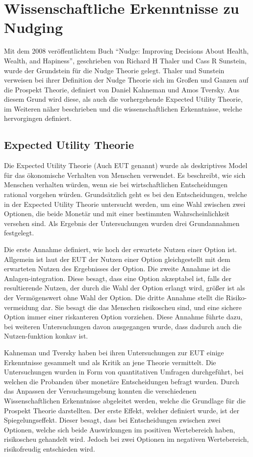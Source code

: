 \chapter{Wissenschaftliche Erkenntnisse zu Nudging}
Mit dem 2008 veröffentlichtem Buch ``Nudge: Improving Decisions About Health, Wealth, and Hapiness'', geschrieben von Richard H Thaler und Cass R Sunstein, wurde der Grundstein für die Nudge Theorie gelegt. Thaler und Sunstein verweisen bei ihrer Definition der Nudge Theorie sich im Großen und Ganzen auf die Prospekt Theorie, definiert von Daniel Kahneman und Amos Tversky. Aus diesem Grund wird diese, als auch die vorhergehende Expected Utility Theorie, im Weiteren näher beschrieben und die wissenschaftlichen Erkenntnisse, welche hervorgingen definiert. 

\section{Expected Utility Theorie}
Die Expected Utility Theorie (Auch EUT genannt) wurde als deskriptives Model für das ökonomische Verhalten von Menschen verwendet. Es beschreibt, wie sich Menschen verhalten würden, wenn sie bei wirtschaftlichen Entscheidungen rational vorgehen würden. \parencite[S. 279]{Friedman.1948}  Grundsätzlich geht es bei den Entscheidungen, welche in der Expected Utility Theorie untersucht werden, um eine Wahl zwischen zwei Optionen, die beide Monetär und mit einer bestimmten Wahrscheinlichkeit versehen sind. Als Ergebnis der Untersuchungen wurden drei Grundannahmen festgelegt.  

Die erste Annahme definiert, wie hoch der erwartete Nutzen einer Option ist. Allgemein ist laut der EUT der Nutzen einer Option gleichgestellt mit dem erwarteten Nutzen des Ergebnisses der Option. Die zweite Annahme ist die Anlagen-integration. Diese besagt, dass eine Option akzeptabel ist, falls der resultierende Nutzen, der durch die Wahl der Option erlangt wird, größer ist als der Vermögenswert ohne Wahl der Option. Die dritte Annahme stellt die Risiko-vermeidung dar. Sie besagt die das Menschen risikoscheu sind, und eine sichere Option immer einer riskanteren Option vorziehen. Diese Annahme führte dazu, bei weiteren Untersuchungen davon ausgegangen wurde, dass dadurch auch die Nutzen-funktion konkav ist. \parencite[S. 127]{Pratt.1964}

Kahneman und Tversky haben bei ihren Untersuchungen zur EUT einige Erkenntnisse gesammelt und als Kritik an jene Theorie vermittelt. Die Untersuchungen wurden in Form von quantitativen Umfragen durchgeführt, bei welchen die Probanden über monetäre Entscheidungen befragt wurden. Durch das Anpassen der Versuchsumgebung konnten die verschiedenen Wissenschaftlichen Erkenntnisse abgeleitet werden, welche die Grundlage für die Prospekt Theorie darstellten. Der erste Effekt, welcher definiert wurde, ist der Spiegelungseffekt. Dieser besagt, dass bei Entscheidungen zwischen zwei Optionen, welche sich beide Auswirkungen im positiven Wertebereich haben, risikoscheu gehandelt wird. Jedoch bei zwei Optionen im negativen Wertebereich, risikofreudig entschieden wird. \parencite[S. 154]{Markowitz.1952}

